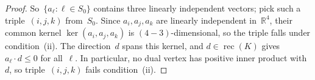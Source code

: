 \begin{unverified}
\begin{proof}
So~$\{a_\ell : \ell \in S_0\}$ contains three linearly independent vectors;
pick such a triple~$(i,j,k)$ from~$S_0$.  Since $a_i, a_j, a_k$ are linearly
independent in~$\mathbb{R}^4$, their common kernel $\ker(a_i, a_j, a_k)$ is
$(4 - 3)$-dimensional, so the triple falls under condition~\textup{(ii)}.
The direction~$d$ spans this kernel, and $d \in \operatorname{rec}(K)$ gives
$a_\ell \cdot d \le 0$ for all~$\ell$.  In particular, no dual vertex has positive
inner product with~$d$, so triple~$(i,j,k)$ fails condition~\textup{(ii)}.
\end{proof}
\end{unverified}
